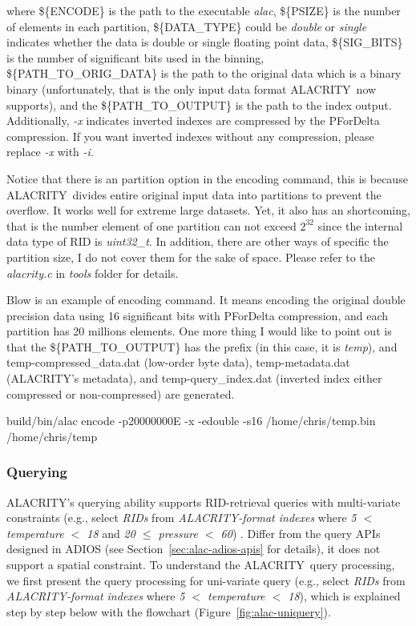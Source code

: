 \documentclass[11pt,a4paper]{article}
\newcommand{\alac}{ALACRITY}
\newcommand{\shell}[1]{\$\{{#1}\}}
\begin{document}
  where \shell{ENCODE} is the path to the executable \emph{alac}, \shell{PSIZE} is the number of elements in each partition, \shell{DATA\_TYPE} could be \emph{double} or \emph{single} indicates whether the data is double or single floating point data, \shell{SIG\_BITS} is the number of significant bits used in the binning, \shell{PATH\_TO\_ORIG\_DATA} is the path to the original data which is a binary binary (unfortunately, that is the only input data format \alac\ now supports), and the \shell{PATH\_TO\_OUTPUT} is the path to the index output.
  Additionally, \emph{-x} indicates inverted indexes are compressed by the PForDelta compression. If you want inverted indexes without any compression, please replace \emph{-x} with \emph{-i}.
  
  Notice that there is an partition option in the encoding command, this is because \alac\ divides entire original input data into partitions to prevent the overflow. It works well for extreme large datasets. Yet, it also has an shortcoming, that is the number element of one partition can not exceed $2^{32}$ since the internal data type of RID is \emph{uint32\_t}. 
  In addition, there are other ways of specific the partition size, I do not cover them for the sake of space. Please refer to the \emph{alacrity.c} in \emph{tools} folder for details. 
  
  Blow is an example of encoding command. It means encoding the original double precision data using 16 significant bits with PForDelta compression, and each partition has 20 millions elements. One more thing I would like to point out is that the \shell{PATH\_TO\_OUTPUT} has the prefix (in this case, it is \emph{temp}), and temp-compressed\_data.dat (low-order byte data), temp-metadata.dat (\alac's metadata), and temp-query\_index.dat (inverted index either compressed or non-compressed) are generated. 
  
  build/bin/alac encode -p20000000E -x -edouble -s16 /home/chris/temp.bin /home/chris/temp
  
  
\subsubsection{Querying}
\label{sec:alac-querying}

\alac's querying ability supports RID-retrieval queries with multi-variate constraints  (e.g., select \emph{RIDs} from \emph{ALACRITY-format indexes} where  \emph{5 $<$  temperature $<$ 18} and \emph{20 $\le$ pressure $<$ 60}) . 
Differ from the query APIs designed in ADIOS (see Section~\ref{sec:alac-adios-apis} for details), it does not support a spatial constraint. 
To understand the \alac\ query processing, we first present the query processing for uni-variate query (e.g., select \emph{RIDs} from \emph{ALACRITY-format indexes} where  \emph{5 $<$  temperature $<$ 18}), which is explained step by step below with the flowchart (Figure~\ref{fig:alac-uniquery}). 
\end{document}
